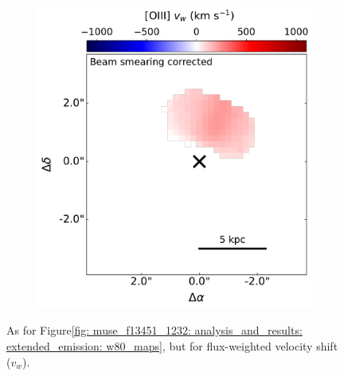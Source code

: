 \begin{figure}
\begin{subfigure}[b]{0.5175\linewidth}
    \label{fig: muse_f13451_1232: analysis_and_results: extended_emission: vw_map_free}
    \end{subfigure}
    \hfill
    \begin{subfigure}{0.43\linewidth}        
        \includegraphics[width=\linewidth, trim={3.1cm 0 0 0}, clip]{figures/muse_f13451_1232/vw_map_nm.pdf}
    \label{fig: muse_f13451_1232: analysis_and_results: extended_emission: vw_map_nm}
    \end{subfigure}
    \caption[Beam-smearing-corrected and non-beam-smearing-corrected flux-weighted velocity shift maps of the central $6\times6$\;arcsecond ($13\times13$\;kpc) region around the primary nucleus of F13451+1232.]{As for Figure\;\ref{fig: muse_f13451_1232: analysis_and_results: extended_emission: w80_maps}, but for flux-weighted velocity shift ($v_w$).}
    \label{fig: muse_f13451_1232: analysis_and_results: extended_emission: vw_maps}
\end{figure}

